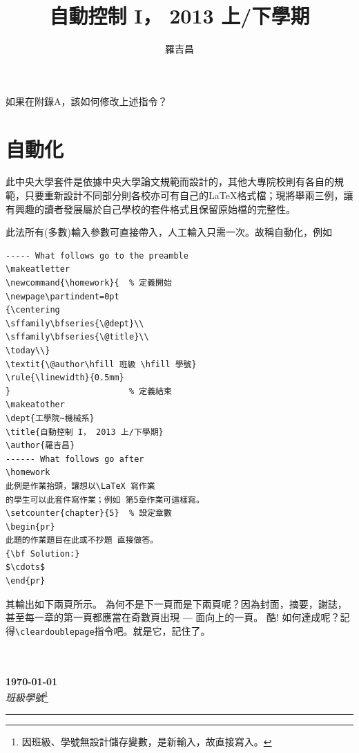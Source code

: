 \begin{appendB}
如果在附錄A，該如何修改上述指令？
\vfil
\newpage
\section{自動化} 
此中央大學套件是依據中央大學論文規範而設計的，其他大專院校則有各自的規範，只要重新設計不同部分則各校亦可有自己的\LaTeX 格式檔；現將舉兩三例，讓有興趣的讀者發展屬於自己學校的套件格式且保留原始檔的完整性。

此法所有(多數)輸入參數可直接帶入，人工輸入只需一次。故稱自動化，例如
\begin{Verbatim}[frame=single,firstline=1,lastline=30,rulecolor=\color{red},label=Homework title page]
----- What follows go to the preamble
\makeatletter
\newcommand{\homework}{  % 定義開始
\newpage\partindent=0pt
{\centering
\sffamily\bfseries{\@dept}\\
\sffamily\bfseries{\@title}\\
\today\\}
\textit{\@author\hfill 班級 \hfill 學號}
\rule{\linewidth}{0.5mm}
}                        % 定義結束
\makeatother
\dept{工學院~機械系}
\title{自動控制 I， 2013 上/下學期}
\author{羅吉昌}
------ What follows go after 
\homework  
此例是作業抬頭，讓想以\LaTeX 寫作業
的學生可以此套件寫作業；例如 第5章作業可這樣寫。
\setcounter{chapter}{5}  % 設定章數
\begin{pr}
此題的作業題目在此或不抄題 直接做答。
{\bf Solution:}
$\cdots$
\end{pr}
\end{Verbatim}       
其輸出如下兩頁所示。
為何不是下一頁而是下兩頁呢？因為封面，摘要，謝誌，甚至每一章的第一頁都應當在奇數頁出現 --- 面向上的一頁。 酷! 如何達成呢？記得\verb|\cleardoublepage|指令吧。就是它，記住了。
\cleardoublepage{}
{}
\makeatletter
\newcommand{\homework}{%
\newpage                              
\setlength{\parindent}{0pt}  
{\centering
\sffamily\bfseries{\@dept}\\  
\sffamily\bfseries{\@title}\\
\today\\}
\textit{\@author\hfill 班級\hfill 學號}\footnote{因班級、學號無設計儲存變數，是新輸入，故直接寫入。} 
\rule{\linewidth}{0.5mm} 
}
\makeatother
{}
\title{自動控制 I， 2013 上/下學期}
\author{羅吉昌}
\homework
{}
 


\end{appendB}
